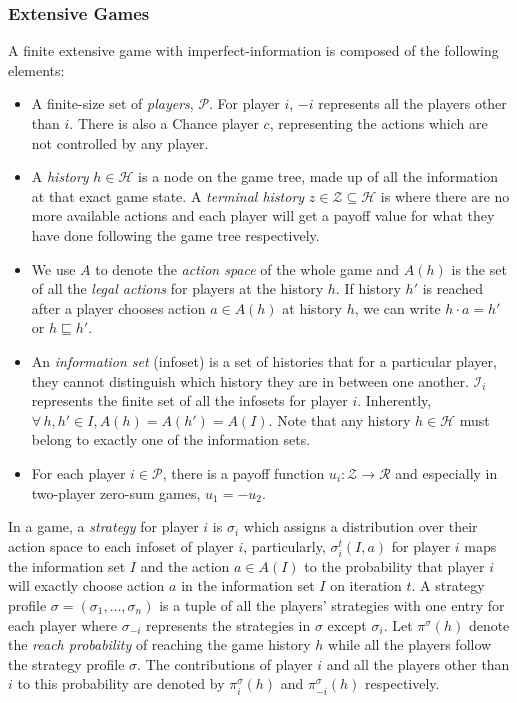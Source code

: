\documentclass[runningheads]{llncs}
\begin{document}
    \subsubsection{Extensive Games~\cite{myerson2013game}}
    A finite extensive game with imperfect-information is composed of the following elements:
    \begin{itemize}
        \item 
        A finite-size set of \textit{players}, $\mathcal{P}$. For player $i$, $-i$ represents all the players other than $i$. There is also a Chance player $c$, representing the actions which are not controlled by any player.
        \item 
        A \textit{history} $h \in \mathcal{H}$ is a node on the game tree, made up of all the information at that exact game state. A \textit{terminal history} $z\in\mathcal{Z}\subseteq\mathcal{H}$ is where there are no more available actions and each player will get a payoff value for what they have done following the game tree respectively.
        \item 
        We use $A$ to denote the \textit{action space} of the whole game and $A(h)$ is the set of all the \textit{legal actions} for players at the history $h$. If history $h'$ is reached after a player chooses action $a\in A(h)$ at history $h$, we can write $h \cdot a = h'$ or $h \sqsubseteq h'$.
        \item 
        An \textit{information set} (infoset) is a set of histories that for a particular player, they cannot distinguish which history they are in between one another. $\mathcal{I}_i$ represents the finite set of all the infosets for player $i$. Inherently, $\forall \, h, h'\in I, A(h)=A(h')=A(I)$. Note that any history $h \in \mathcal{H}$ must belong to exactly one of the information sets.
        \item 
        For each player $i\in\mathcal{P}$, there is a payoff function $u_i: \mathcal{Z} \rightarrow \mathcal{R}$ and especially in two-player zero-sum games, $u_1 = -u_2$. 
    \end{itemize}
    
    In a game, a \textit{strategy} for player $i$ is $\sigma_i$ which assigns a distribution over their action space to each infoset of player $i$, particularly, $\sigma^t_i(I, a)$ for player $i$ maps the information set $I$ and the action $a\in A(I)$ to the probability that player $i$ will exactly choose action $a$ in the information set $I$ on iteration $t$. A strategy profile $\sigma = (\sigma_1,\dots,\sigma_n)$ is a tuple of all the players' strategies with one entry for each player where $\sigma_{-i}$ represents the strategies in $\sigma$ except $\sigma_i$. Let $\pi^\sigma(h)$ denote the \textit{reach probability} of reaching the game history $h$ while all the players follow the strategy profile $\sigma$. The contributions of player $i$ and all the players other than $i$ to this probability are denoted by $\pi^\sigma_i(h)$ and $\pi^\sigma_{-i}(h)$ respectively.
    
\end{document}
